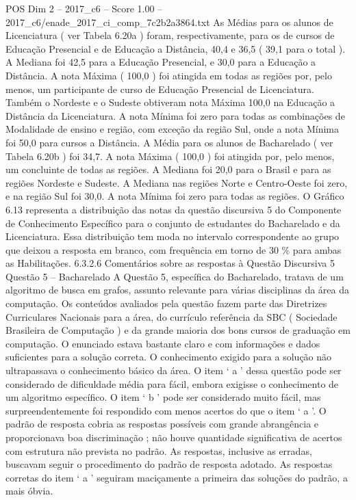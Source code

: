 \begin{textsample}{POS Dim 2 – 2017\_c6 – Score 1.00 – 2017\_c6/enade\_2017\_ci\_comp\_7c2b2a3864.txt}
As Médias para os alunos de Licenciatura ( ver Tabela 6.20a ) foram, respectivamente, para os de cursos de Educação Presencial e de Educação a Distância, 40,4 e 36,5 ( 39,1 para o total ).
A Mediana foi 42,5 para a Educação Presencial, e 30,0 para a Educação a Distância.
A nota Máxima ( 100,0 ) foi atingida em todas as regiões por, pelo menos, um participante de curso de Educação Presencial de Licenciatura.
Também o Nordeste e o Sudeste obtiveram nota Máxima 100,0 na Educação a Distância da Licenciatura.
A nota Mínima foi zero para todas as combinações de Modalidade de ensino e região, com exceção da região Sul, onde a nota Mínima foi 50,0 para cursos a Distância.
A Média para os alunos de Bacharelado ( ver Tabela 6.20b ) foi 34,7.
A nota Máxima ( 100,0 ) foi atingida por, pelo menos, um concluinte de todas as regiões.
A Mediana foi 20,0 para o Brasil e para as regiões Nordeste e Sudeste.
A Mediana nas regiões Norte e Centro-Oeste foi zero, e na região Sul foi 30,0.
A nota Mínima foi zero para todas as regiões.
O Gráfico 6.13 representa a distribuição das notas da questão discursiva 5 do Componente de Conhecimento Específico para o conjunto de estudantes do Bacharelado e da Licenciatura.
Essa distribuição tem moda no intervalo correspondente ao grupo que deixou a resposta em branco, com frequência em torno de 30 \% para ambas as Habilitações. 6.3.2.6 Comentários sobre as respostas à Questão Discursiva 5 Questão 5 – Bacharelado A Questão 5, específica do Bacharelado, tratava de um algoritmo de busca em grafos, assunto relevante para várias disciplinas da área da computação.
Os conteúdos avaliados pela questão fazem parte das Diretrizes Curriculares Nacionais para a área, do currículo referência da SBC ( Sociedade Brasileira de Computação ) e da grande maioria dos bons cursos de graduação em computação.
O enunciado estava bastante claro e com informações e dados suficientes para a solução correta.
O conhecimento exigido para a solução não ultrapassava o conhecimento básico da área.
O item ‘ a ’ dessa questão pode ser considerado de dificuldade média para fácil, embora exigisse o conhecimento de um algoritmo específico.
O item ‘ b ’ pode ser considerado muito fácil, mas surpreendentemente foi respondido com menos acertos do que o item ‘ a ’.
O padrão de resposta cobria as respostas possíveis com grande abrangência e proporcionava boa discriminação ; não houve quantidade significativa de acertos com estrutura não prevista no padrão.
As respostas, inclusive as erradas, buscavam seguir o procedimento do padrão de resposta adotado.
As respostas corretas do item ‘ a ’ seguiram maciçamente a primeira das soluções do padrão, a mais óbvia.

\end{textsample}
